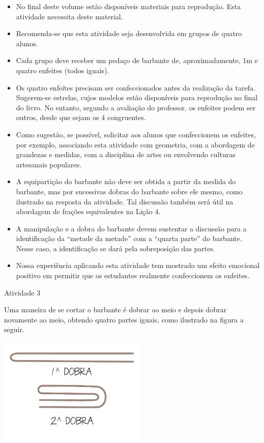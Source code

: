 \begin{multicols}{2}
  \begin{itemize} %
   \item No final deste volume estão disponíveis materiais para reprodução. Esta atividade necessita deste material.
   \item Recomenda-se que esta atividade seja desenvolvida em grupos de quatro alunos.
   \item       Cada grupo deve receber um pedaço de barbante de, aproximadamente, 1m e quatro enfeites (todos iguais).
    \item       Os quatro enfeites precisam ser confeccionados antes da realização da tarefa. Sugerem-se estrelas, cujos modelos estão disponíveis para reprodução no final do livro. No entanto, segundo a avaliação do professor, os enfeites podem ser outros, desde que sejam os 4 congruentes.
    \item       Como sugestão, se possível, solicitar aos alunos que confeccionem os enfeites, por exemplo, associando esta atividade com geometria, com a abordagem de grandezas e medidas, com a disciplina de artes ou envolvendo culturas artesanais populares.
    \item       A equipartição do barbante não deve ser obtida a partir da medida do barbante, mas por sucessivas dobras do barbante sobre ele mesmo, como ilustrado na resposta da atividade. Tal discussão também  será útil na abordagem de frações equivalentes na Lição 4.
    \item       A manipulação e a dobra do barbante devem sustentar a discussão para a identificação da       ``metade da metade'' com a       ``quarta parte'' do barbante. Nesse caso, a identificação se dará pela sobreposição das partes.
      \item Nossa experiência aplicando esta atividade tem mostrado um efeito emocional positivo em permitir que os estudantes realmente confeccionem os enfeites.
\end{itemize} %

\vspace*{\fill}
\columnbreak

\begin{resposta*}{Atividade 3}

Uma maneira de se cortar o barbante é dobrar ao meio e depois dobrar novamente ao meio, obtendo quatro partes iguais, como ilustrado na figura a seguir.
  \begin{center}
  \includegraphics[width=200pt, keepaspectratio]{../figuras/licao01/ativ3_fig03.png}
  \end{center}
\end{resposta*}
\end{multicols}

